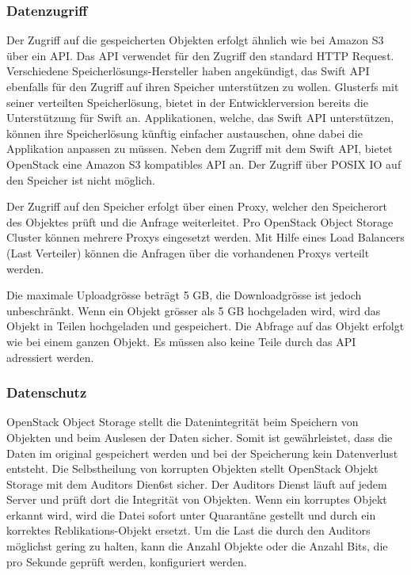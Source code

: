 \subsubsection*{Datenzugriff}
Der Zugriff auf die gespeicherten Objekten erfolgt ähnlich wie bei Amazon S3 über ein API. Das API verwendet für den Zugriff den standard HTTP Request. Verschiedene Speicherlösungs-Hersteller haben angekündigt, das Swift API ebenfalls für den Zugriff auf ihren Speicher unterstützen zu wollen. Glusterfs mit seiner verteilten Speicherlösung, bietet in der Entwicklerversion bereits die Unterstützung für Swift an. Applikationen, welche, das Swift API unterstützen, können ihre Speicherlösung künftig einfacher austauschen, ohne dabei die Applikation anpassen zu müssen. Neben dem Zugriff mit dem Swift API, bietet OpenStack eine Amazon S3 kompatibles API an. Der Zugriff über POSIX IO auf den Speicher ist nicht möglich.

Der Zugriff auf den Speicher erfolgt über einen Proxy, welcher den Speicherort des Objektes prüft und die Anfrage weiterleitet. Pro OpenStack Object Storage Cluster können mehrere Proxys eingesetzt werden. Mit Hilfe eines Load Balancers (Last Verteiler) können die Anfragen über die vorhandenen Proxys verteilt werden.

Die maximale Uploadgrösse beträgt 5 GB, die Downloadgrösse ist jedoch unbeschränkt. Wenn ein Objekt grösser als 5 GB hochgeladen wird, wird das Objekt in Teilen hochgeladen und gespeichert. Die Abfrage auf das Objekt erfolgt wie bei einem ganzen Objekt. Es müssen also keine Teile durch das API adressiert werden. \cite{OpenStack2012a}


\subsubsection*{Datenschutz}
OpenStack Object Storage stellt die Datenintegrität beim Speichern von Objekten und beim Auslesen der Daten sicher. Somit ist gewährleistet, dass die Daten im original gespeichert werden und bei der Speicherung kein Datenverlust entsteht. Die Selbstheilung von korrupten Objekten stellt OpenStack Objekt Storage mit dem Auditors Dien6st sicher. Der Auditors Dienst läuft auf jedem Server und prüft dort die Integrität von Objekten. Wenn ein korruptes Objekt erkannt wird, wird die Datei sofort unter Quarantäne gestellt und durch ein korrektes Reblikations-Objekt ersetzt.
Um die Last die durch den Auditors möglichst gering zu halten, kann die Anzahl Objekte oder die Anzahl Bits, die pro Sekunde geprüft werden, konfiguriert werden. \cite{OpenStack2012}

